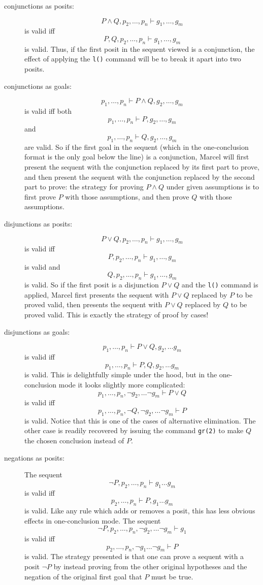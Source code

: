 \documentclass[12pt]{book}
\begin{document}
\begin{description}

\item[conjunctions as posits:]  $$P \wedge Q,p_2,\ldots,p_n \vdash g_1,\ldots,g_m$$ is valid iff $$P, Q,p_2,\ldots,p_n \vdash g_1,\ldots,g_m$$ is valid. Thus, if the first posit in the sequent viewed is a conjunction, the effect of applying the {\tt l()} command will be to break it apart into two posits.

\item[conjunctions as goals:]  $$p_1,\ldots,p_n \vdash P \wedge Q,g_2,\ldots,g_m$$ is valid iff both $$p_1,\ldots,p_n \vdash P,g_2,\ldots,g_m$$ and $$p_1,\ldots,p_n \vdash Q,g_2,\ldots,g_m$$ are valid.  So if the first goal in the sequent (which in the one-conclusion format is the only goal below the line) is a conjunction, Marcel will first present the sequent with the conjunction replaced by its first part to prove, and then present the sequent with the conjunction replaced by the second part to prove:  the strategy for proving $P \wedge Q$ under given assumptions is to first prove $P$ with those assumptions, and then prove $Q$ with those assumptions.

\item[disjunctions as posits:]   $$P \vee Q,p_2,\ldots,p_n \vdash g_1,\ldots,g_m$$ is valid iff $$P,p_2,\ldots,p_n \vdash g_1,\ldots,g_m$$ is valid and $$Q,p_2,\ldots,p_n \vdash g_1,\ldots,g_m$$ is valid.  So if the first posit is a disjunction $P \vee Q$ and the {\tt l()} command is applied, Marcel first presents the sequent with $P \vee Q$ replaced by $P$ to be proved valid, then presents the sequent with $P \vee Q$ replaced by $Q$ to be proved valid.  This is exactly the strategy of proof by cases!

\item[disjunctions as goals:]  $$p_1,\ldots,p_n \vdash P \vee Q,g_2,\ldots g_m$$ is valid iff $$p_1,\ldots,p_n \vdash P,Q,g_2,\ldots g_m$$ is valid.  This is delightfully simple under the hood, but in the one-conclusion mode it looks slightly more complicated:  $$p_1,\ldots,p_n,\neg g_2,\ldots \neg g_m \vdash P \vee Q$$ is valid iff $$p_1,\ldots,p_n,\neg Q,\neg g_2,\ldots \neg g_m \vdash P$$ is valid.  Notice that this is one of the cases of alternative elimination.  The other case is readily recovered by issuing the command {\tt gr(2)} to make $Q$ the chosen conclusion instead of $P$.

\item[negations as posits:]  The sequent $$\neg P,p_2,\ldots,p_n\vdash g_1\ldots g_m$$ is valid iff $$p_2,\ldots,p_n\vdash P,g_1\ldots g_m $$ is valid.
Like any rule which adds or removes a posit, this has less obvious effects in one-conclusion mode.  The sequent $$\neg P,p_2,\ldots,p_n,\neg g_2,\ldots \neg g_m\vdash g_1$$ is valid iff $$p_2,\ldots,p_n,\neg g_1\ldots \neg g_m \vdash P$$ is valid.  The strategy presented is that one can prove a sequent with  a posit 
$\neg P$ by instead proving from the other original hypotheses and the negation of the original first goal that $P$ must be true.  


\end{description}
\end{document}
